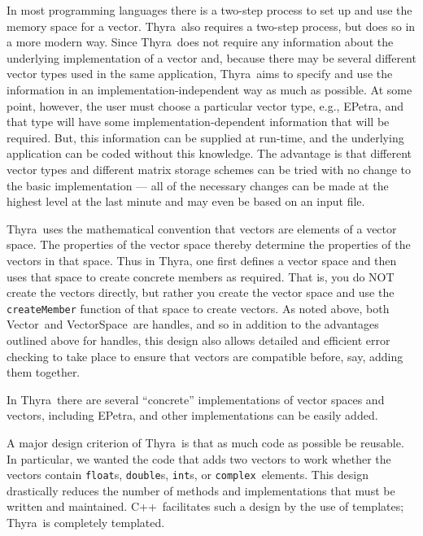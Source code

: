 \documentclass[12pt]{article}
\newcommand{\thyra}{{\sf Thyra}}
\newcommand{\epetra}{{\sf EPetra}}
\newcommand{\cpp}{{\sf C++}}
\newcommand{\template}{{\sf template}}
\renewcommand{\vector}{{\sf Vector}}
\newcommand{\vectorSpace}{{\sf VectorSpace}}
\newcommand{\float}{{\tt float}}
\newcommand{\double}{{\tt double}}
\renewcommand{\int}{{\tt int}}
\newcommand{\complex}{{\tt complex}}
\newcommand{\lcode}[1]{{\tt #1}}
\begin{document}
In most programming languages there is a two-step process to set up
and use the memory space for a vector.  \thyra\ also requires a
two-step process, but does so in a more modern way.  Since \thyra\ 
does not require any information about the underlying implementation
of a vector and, because there may be several different vector types
used in the same application, \thyra\ aims to specify and use the
information in an implementation-independent way as much as possible.
At some point, however, the user must choose a particular vector type,
e.g., \epetra, and that type will have some implementation-dependent
information that will be required.  But, this information can be
supplied at run-time, and the underlying application can be coded
without this knowledge.  The advantage is that different vector types
and different matrix storage schemes can be tried with no change to
the basic implementation --- all of the necessary changes can be made
at the highest level at the last minute and may even be based on an
input file.


\thyra\ uses the mathematical convention that vectors are elements of
a vector space.  The properties of the vector space thereby determine the
properties of the vectors in that space.  Thus in \thyra, one first
defines a vector space and then uses that space to create concrete
members as required.   That is, you do NOT create the vectors
directly, but rather you create the vector space and use the
\lcode{createMember} function of that space to create vectors.  
As noted above, both \vector\ and \vectorSpace\ are handles, and so 
in
addition to the advantages outlined above for handles, this design
also allows detailed and efficient error checking to take place to ensure that
vectors are compatible before, say, adding them together. 

In \thyra\ there are several ``concrete'' implementations of vector
spaces and vectors, including \epetra, and  other implementations can
be easily added.

A major design criterion of \thyra\ is that as much code as possible
be reusable. In particular, we wanted the code that adds two vectors
to work whether the vectors contain \float s, \double s, \int s, or
\complex\ elements.  This design drastically reduces the number of
methods and implementations that must be written and maintained.
\cpp\ facilitates such a design by the use of \template s; \thyra\ is
completely \template d.
\end{document}
